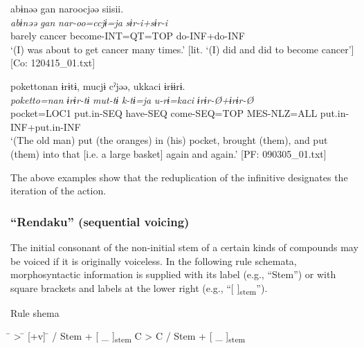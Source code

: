 \ex\label{ex:4.38b}     %
\glll    abɨnəə  gan  naroocjəə  siisii.\\
      \textit{abɨnəə}  \textit{gan}  \textit{nar-oo=ccjɨ=ja}  \textit{sɨr-i+sɨr-i}\\
      barely  cancer  become-INT=QT=TOP  do-INF+do-INF\\
      \glt       ‘(I) was about to get cancer many times.’ [lit. ‘(I) did and did to become cancer’] [Co: 120415\_01.txt]

\ex\label{ex:4.38c}%
    \glll   {\textbar}poketto{\textbar}nan  ɨrɨtɨ,  mucjɨ  cˀjəə,  ukkaci   ɨrɨɨrɨ.  \\
      \textit{poketto=nan}  \textit{ɨrɨr-tɨ}  \textit{mut-tɨ}  \textit{k-tɨ=ja}  \textit{u-rɨ=kaci}    \textit{ɨrɨr-Ø+ɨrɨr-Ø}  \\
      pocket=LOC1  put.in-SEQ  have-SEQ  come-SEQ=TOP  MES-NLZ=ALL   put.in-INF+put.in-INF  \\
      \glt       ‘(The old man) put (the oranges) in (his) pocket, brought (them), and put (them) into that [i.e. a large basket] again and again.’ [PF: 090305\_01.txt]
    \z
\z

The above examples show that the reduplication of the infinitive designates the iteration of the action.

\subsubsection{“Rendaku” (sequential voicing)}\label{sec:4.2.3.4}

The initial consonant of the non-initial stem of a certain kinds of compounds may be voiced if it is originally voiceless. In the following rule schemata, morphosyntactic information is supplied with its label (e.g., “Stem”) or with square brackets and labels at the lower right (e.g., “[    ]\textsubscript{stem}”).

\ea  Rule shema \label{ex:4.39}
\begin{tabbing}
[\textminus v] \hspace{\tabcolsep}\=\hspace{\tabcolsep} > \hspace{\tabcolsep}\=\hspace{\tabcolsep} [+v] \hspace{\tabcolsep}\=\hspace{\tabcolsep} /  Stem  +  [ \_   ]\textsubscript{stem}\kill
C              \> > \> C \> /  Stem  +  [ \_   ]\textsubscript{stem}\\\relax
[\textminus v] \>   \> [+v] \>
\end{tabbing}
\z

